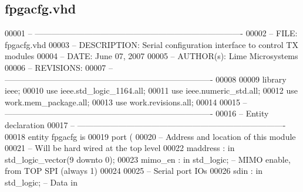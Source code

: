 \subsection{fpgacfg.\+vhd}
\label{fpgacfg_8vhd_source}

\begin{DoxyCode}
00001 \textcolor{keyword}{-- ---------------------------------------------------------------------------- }
00002 \textcolor{keyword}{-- FILE:    fpgacfg.vhd}
00003 \textcolor{keyword}{-- DESCRIPTION: Serial configuration interface to control TX modules}
00004 \textcolor{keyword}{-- DATE:    June 07, 2007}
00005 \textcolor{keyword}{-- AUTHOR(s):   Lime Microsystems}
00006 \textcolor{keyword}{-- REVISIONS:   }
00007 \textcolor{keyword}{-- ---------------------------------------------------------------------------- }
00008 
00009 \textcolor{vhdlkeyword}{library }\textcolor{keywordflow}{ieee};
00010 \textcolor{vhdlkeyword}{use }ieee.std\_logic\_1164.\textcolor{keywordflow}{all};
00011 \textcolor{vhdlkeyword}{use }ieee.numeric\_std.\textcolor{keywordflow}{all};
00012 \textcolor{vhdlkeyword}{use }work.mem_package.\textcolor{keywordflow}{all};
00013 \textcolor{vhdlkeyword}{use }work.revisions.\textcolor{keywordflow}{all};
00014 
00015 \textcolor{keyword}{-- ----------------------------------------------------------------------------}
00016 \textcolor{keyword}{-- Entity declaration}
00017 \textcolor{keyword}{-- ----------------------------------------------------------------------------}
00018 \textcolor{keywordflow}{entity }fpgacfg \textcolor{keywordflow}{is}
00019     \textcolor{keywordflow}{port} \textcolor{vhdlchar}{(}
00020 \textcolor{keyword}{        -- Address and location of this module}
00021 \textcolor{keyword}{        -- Will be hard wired at the top level}
00022         \textcolor{vhdlchar}{maddress}    \textcolor{vhdlchar}{:} \textcolor{keywordflow}{in} \textcolor{comment}{std\_logic\_vector}\textcolor{vhdlchar}{(}\textcolor{vhdllogic}{}\textcolor{vhdllogic}{9} \textcolor{keywordflow}{downto} \textcolor{vhdllogic}{}\textcolor{vhdllogic}{0}\textcolor{vhdlchar}{)};
00023         \textcolor{vhdlchar}{mimo_en} \textcolor{vhdlchar}{:} \textcolor{keywordflow}{in} \textcolor{comment}{std\_logic};\textcolor{keyword}{ -- MIMO enable, from TOP SPI (always 1)}
00024     
00025 \textcolor{keyword}{        -- Serial port IOs}
00026         \textcolor{vhdlchar}{sdin}    \textcolor{vhdlchar}{:} \textcolor{keywordflow}{in} \textcolor{comment}{std\_logic};\textcolor{keyword}{     -- Data in}

\end{DoxyCode}
